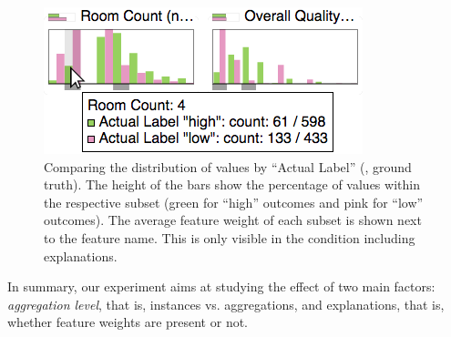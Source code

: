 \begin{figure}[t]
\centering
\includegraphics[width=0.7\linewidth]{aggexplain/histogram}
\caption[Comparing the distribution of values by ``Actual Label''.]{
Comparing the distribution of values by ``Actual Label'' (\ie, ground truth).
The height of the bars show the percentage of values within the respective subset (green for ``high'' outcomes and pink for ``low'' outcomes).
The average feature weight of each subset is shown next to the feature name.
This is only visible in the condition including explanations.
}
\label{figs:histogram}
\end{figure}

In summary, our experiment aims at studying the effect of two main factors: \textit{aggregation level}, that is, instances vs. aggregations, and explanations, that is, whether feature weights are present or not.





